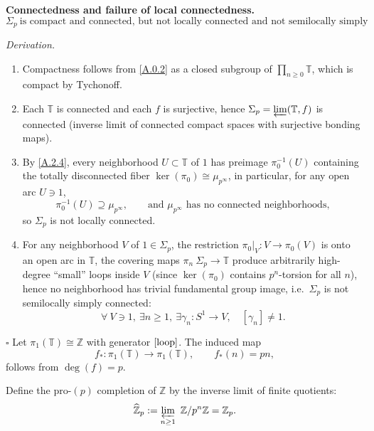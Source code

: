 \documentclass[11pt]{article}
\theoremstyle{remark}
\begin{document}
\textbf{Connectedness and failure of local connectedness.}
\begin{equation}
\Sigma_{p}\ \text{is compact and connected, but not locally connected and not semilocally simply connected.}
\label{A.2.5}
\end{equation}

\noindent\textit{Derivation.}
\begin{enumerate}
\item Compactness follows from \eqref{A.0.2} as a closed subgroup of $\prod_{n\ge 0}\mathbb T$, which is compact by Tychonoff.
\item Each $\mathbb T$ is connected and each $f$ is surjective, hence $\Sigma_{p}=\varprojlim(\mathbb T,f)$ is connected (inverse limit of connected compact spaces with surjective bonding maps).
\item By \eqref{A.2.4}, every neighborhood $U\subset\mathbb T$ of $1$ has preimage $\pi_{0}^{-1}(U)$ containing the totally disconnected fiber $\ker(\pi_{0})\cong\mu_{p^{\infty}}$, in particular, for any open arc $U\ni 1$,
\begin{equation}
\pi_{0}^{-1}(U)\supseteq \mu_{p^{\infty}},
\qquad
\text{and }\mu_{p^{\infty}}\text{ has no connected neighborhoods},
\label{A.2.6}
\end{equation}
so $\Sigma_{p}$ is not locally connected.
\item For any neighborhood $V$ of $1\in\Sigma_{p}$, the restriction $\pi_{0}|_{V}:V\to \pi_{0}(V)$ is onto an open arc in $\mathbb T$, the covering maps $\pi_{n}\:\Sigma_{p}\to\mathbb T$ produce arbitrarily high-degree ``small'' loops inside $V$ (since $\ker(\pi_{0})$ contains $p^{n}$-torsion for all $n$), hence no neighborhood has trivial fundamental group image, i.e.\ $\Sigma_{p}$ is not semilocally simply connected:
\begin{equation}
\forall\ V\ni 1,\ \exists n\ge 1,\ \exists \gamma_{n}:S^{1}\to V,\quad [\gamma_{n}]\ne 1.
\label{A.2.7}
\end{equation}
\end{enumerate}
\hfill$\square$
Let $\pi_{1}(\mathbb T)\cong\mathbb Z$ with generator $[{\rm loop}]$. The induced map
\begin{equation}
f_{*}:\pi_{1}(\mathbb T)\to\pi_{1}(\mathbb T),
\qquad
f_{*}(n)=pn,
\label{A.3.1}
\end{equation}
follows from $\deg(f)=p$.

Define the pro-$(p)$ completion of $\mathbb Z$ by the inverse limit of finite quotients:
\begin{equation}
\widehat{\mathbb Z}_{p}
:=\varprojlim_{n\ge 1}\ \mathbb Z/p^{n}\mathbb Z
=\mathbb Z_{p}.
\label{A.3.2}
\end{equation}
\end{document}
